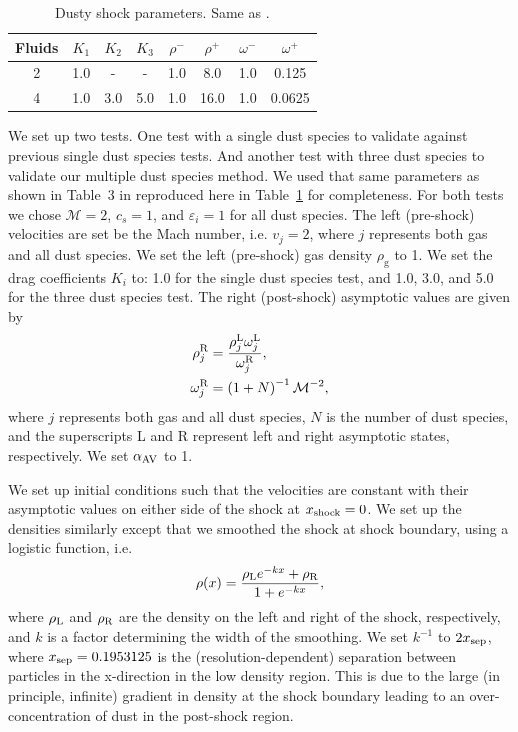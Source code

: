 \documentclass[fleqn,usenatbib]{mnras}
\newcommand{\g}{\mathrm{g}}
\begin{document}
\begin{table}
   \centering
   \begin{tabular}{cccccccc}
      \hline
      \hline
      Fluids & \(K_1\) & \(K_2\) & \(K_3\) & \(\rho^-\) & \(\rho^+\) & \(\omega^-\) & \(\omega^+\) \\
      \hline
      2 & 1.0 & - & - & 1.0 & 8.0 & 1.0 & 0.125 \\
      4 & 1.0 & 3.0 & 5.0 & 1.0 & 16.0 & 1.0 & 0.0625 \\
      \hline
   \end{tabular}
   \caption{Dusty shock parameters. Same as \citet{Benitez-Llambay2019ApJS..241...25B}.}%
   \label{tab:shock}
\end{table}

We set up two tests. One test with a single dust species to validate against
previous single dust species tests. And another test with three dust species to
validate our multiple dust species method. We used that same parameters as shown
in Table~3 in \citet{Benitez-Llambay2019ApJS..241...25B} reproduced here in
Table~\ref{tab:shock} for completeness. For both tests we chose \(\mathcal{M} =
2\), \(c_s = 1\), and \(\varepsilon_i = 1\) for all dust species. The left
(pre-shock) velocities are set be the Mach number, i.e. \(v_j= 2\), where \(j\)
represents both gas and all dust species. We set the left (pre-shock) gas
density \(\rho_{\g}\) to 1. We set the drag coefficients \(K_i\) to: 1.0 for the
single dust species test, and 1.0, 3.0, and 5.0 for the three dust species test.
The right (post-shock) asymptotic values are given by
%
\begin{align}
   \rho_{j}^{\rm R} &=
      \frac{\rho_{j}^{\rm L} \omega_{j}^{\rm L}} {\omega_{j}^{\rm R}}, \\
   \omega_j^{\rm R} &= \left(1 + N \right)^{-1} \mathcal{M}^{-2},
\end{align}
%
where \(j\) represents both gas and all dust species, \(N\) is the number of
dust species, and the superscripts L and R represent left and right asymptotic
states, respectively. We set \(\alpha_{\rm AV}\) to 1.

We set up initial conditions such that the velocities are constant with their
asymptotic values on either side of the shock at \(x_{\rm shock} = 0\). We set
up the densities similarly except that we smoothed the shock at shock boundary,
using a logistic function, i.e.
%
\begin{align}
   \rho(x) = \frac{\rho_{\rm L} e^{-kx} + \rho_{\rm R}}{1 + e^{-kx}},
\end{align}
%
where \(\rho_{\rm L}\) and \(\rho_{\rm R}\) are the density on the left and
right of the shock, respectively, and \(k\) is a factor determining the width of
the smoothing. We set \(k^{-1}\) to \(2 x_{\rm sep}\), where \(x_{\rm sep} =
0.1953125\) is the (resolution-dependent) separation between particles in the
x-direction in the low density region. This is due to the large (in principle,
infinite) gradient in density at the shock boundary leading to an
over-concentration of dust in the post-shock region.
\end{document}
